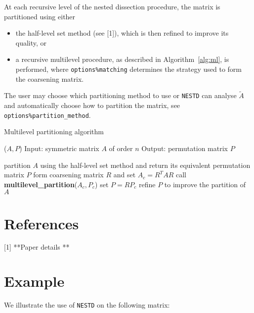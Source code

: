 At each recursive level of the nested dissection procedure, the matrix is 
partitioned using either 
\begin{itemize}
\item the half-level set method (see [1]), which is then refined to improve its 
quality, or 
\item a recursive multilevel procedure, as described in Algorithm~\ref{alg:ml}, 
is performed, where \texttt{options\%matching} determines the strategy used to form 
the coarsening matrix.
\end{itemize}
The user may choose which partitioning method to use or {\tt NESTD} can analyse 
$\widetilde{A}$ and automatically choose how to partition the matrix, see 
\texttt{options\%partition\_method}.

\begin{algorithm}\caption{Multilevel partitioning algorithm}\label{alg:ml}
\begin{algorithmic}
($A,P$)
\STATE Input: symmetric matrix $A$ of order $n$
\STATE Output: permutation matrix $P$

\STATE partition $A$ using the half-level set method and return its equivalent permutation matrix $P$ 
\ELSE
\STATE form coarsening matrix $R$ and set $A_c = R^T A R$
\STATE call {\bf multilevel\_partition}($A_c,P_c$)
\STATE set $P = RP_c$
\STATE refine $P$ to improve the partition of $A$
\ENDIF

\end{algorithmic}
\end{algorithm}


\section*{References}
[1] **Paper details **




\section{Example}

We illustrate the use of {\tt NESTD} on the following matrix: 

